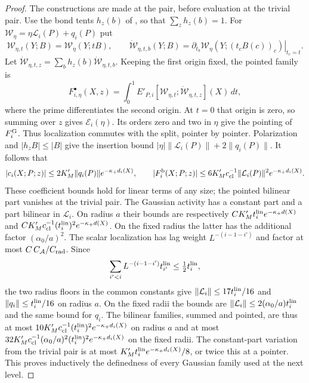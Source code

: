 \documentclass[11pt,letterpaper,reqno]{amsart}
\theoremstyle{definition}
\theoremstyle{remark}
\begin{document}
\begin{proof}
The constructions are made at the pair, before evaluation at the
trivial pair. Use the bond tents $h_z(b)$ of
\cite[eq.~4.cxxvii]{YMM1}, so that $\sum_zh_z(b)=1$.
For $\mathcal W_\eta=\eta\mathcal L_i(P)+q_i(P)$ put
\[
 \mathcal W_{\eta,t}(Y;B)=\mathcal W_\eta(Y;tB),\qquad
 \dot{\mathcal W}_{\eta,t,b}(Y;B)=
 \left.\partial_{t_b}\mathcal W_\eta(Y;(t_cB(c))_c)\right|_{t_c=t}.
\]
Let $\dot{\mathcal W}_{\eta,t,z}=\sum_bh_z(b)\dot{\mathcal W}_{\eta,t,b}$.
Keeping the first origin fixed, the pointed family is
\[
 F_{i,\eta}^\bullet(X,z)=\int_0^1
 E'_{P,i}[\mathcal W_{\eta,t};\dot{\mathcal W}_{\eta,t,z}](X)\,dt,
\]
where the prime differentiates the second origin. At $t=0$ that
origin is zero, so summing over $z$ gives $\mathcal E_i(\eta)$.
Its orders zero and two in $\eta$ give the pointing of $F_i^{\rm G}$.
Thus localization commutes with the split, pointer by pointer.
Polarization and $|h_zB|\le|B|$ give the insertion bound
$|\eta|\|\mathcal L_i(P)\|+2\|q_i(P)\|$. It follows that
\[
 |c_i(X;P;z)|\le2K'_M\|q_i(P)\|e^{-\kappa_+d_i(X)},\qquad
 |F_i^{\rm b}(X;P;z)|\le6K'_Mc_{\rm cl}^{-1}
                  \|\mathcal L_i(P)\|^2e^{-\kappa_+d_i(X)}.
\]
These coefficient bounds hold for linear terms of any size;
the pointed bilinear part vanishes at the trivial pair.
The Gaussian activity has a constant part and a part bilinear in
$\mathcal L_i$. On radius $a$ their bounds are respectively
$C K'_M t_i^{\rm lin} e^{-\kappa_+d(X)}$ and
$C K'_M c_{\rm cl}^{-1}(t_i^{\rm lin})^2e^{-\kappa_+d(X)}$.
On the fixed radius the latter has the additional factor
$(\alpha_0/a)^2$. The scalar localization has lag weight
$L^{-(i-1-i')}$ and factor at most
$C\,C_{\mathcal A}/C_{\rm rad}$. Since
\[
 \sum_{i'<i}L^{-(i-1-i')}t_{i'}^{\rm lin}\le\tfrac12t_i^{\rm lin},
\]
the two radius floors in the common constants give
$\|\mathcal L_i\|\le17t_i^{\rm lin}/16$ and
$\|q_i\|\le t_i^{\rm lin}/16$ on radius $a$.
On the fixed radii the bounds are
$\|\mathcal L_i\|\le2(\alpha_0/a)t_i^{\rm lin}$ and the
same bound for $q_i$. The bilinear families, summed and
pointed, are thus at most
$10K'_Mc_{\rm cl}^{-1}(t_i^{\rm lin})^2e^{-\kappa_+d_i(X)}$
on radius $a$ and at most
$32K'_Mc_{\rm cl}^{-1}(\alpha_0/a)^2(t_i^{\rm lin})^2
e^{-\kappa_+d_i(X)}$ on the fixed radii. The constant-part
variation from the trivial pair is at most
$K'_Mt_i^{\rm lin}e^{-\kappa_+d_i(X)}/8$, or twice this
at a pointer. This proves inductively the definedness of
every Gaussian family used at the next level.


\end{proof}
\end{document}

